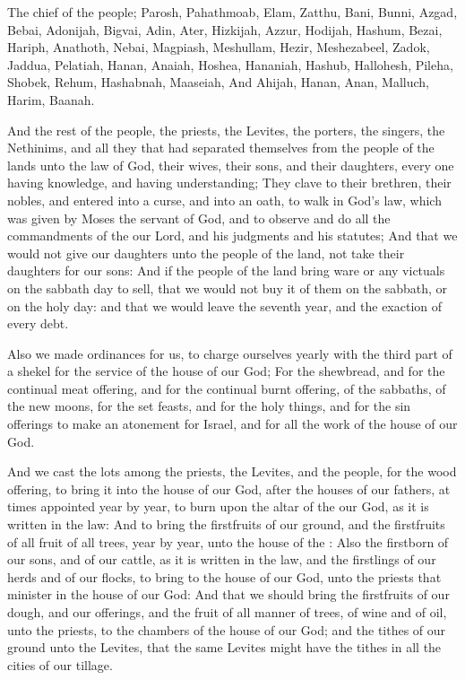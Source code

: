 \Verse The chief of the people; Parosh, Pahathmoab, Elam, Zatthu, Bani, \Verse Bunni, Azgad, Bebai, \Verse Adonijah, Bigvai, Adin, \Verse Ater, Hizkijah, Azzur, \Verse Hodijah, Hashum, Bezai, \Verse Hariph, Anathoth, Nebai, \Verse Magpiash, Meshullam, Hezir, \Verse Meshezabeel, Zadok, Jaddua, \Verse Pelatiah, Hanan, Anaiah, \Verse Hoshea, Hananiah, Hashub, \Verse Hallohesh, Pileha, Shobek, \Verse Rehum, Hashabnah, Maaseiah, \Verse And Ahijah, Hanan, Anan, \Verse Malluch, Harim, Baanah.

\Verse And the rest of the people, the priests, the Levites, the porters, the singers, the Nethinims, and all they that had separated themselves from the people of the lands unto the law of God, their wives, their sons, and their daughters, every one having knowledge, and having understanding; \Verse They clave to their brethren, their nobles, and entered into a curse, and into an oath, to walk in God's law, which was given by Moses the servant of God, and to observe and do all the commandments of the \LORD our Lord, and his judgments and his statutes; \Verse And that we would not give our daughters unto the people of the land, not take their daughters for our sons: \Verse And if the people of the land bring ware or any victuals on the sabbath day to sell, that we would not buy it of them on the sabbath, or on the holy day: and that we would leave the seventh year, and the exaction of every debt.

\Verse Also we made ordinances for us, to charge ourselves yearly with the third part of a shekel for the service of the house of our God; \Verse For the shewbread, and for the continual meat offering, and for the continual burnt offering, of the sabbaths, of the new moons, for the set feasts, and for the holy things, and for the sin offerings to make an atonement for Israel, and for all the work of the house of our God.

\Verse And we cast the lots among the priests, the Levites, and the people, for the wood offering, to bring it into the house of our God, after the houses of our fathers, at times appointed year by year, to burn upon the altar of the \LORD our God, as it is written in the law: \Verse And to bring the firstfruits of our ground, and the firstfruits of all fruit of all trees, year by year, unto the house of the \LORD: \Verse Also the firstborn of our sons, and of our cattle, as it is written in the law, and the firstlings of our herds and of our flocks, to bring to the house of our God, unto the priests that minister in the house of our God: \Verse And that we should bring the firstfruits of our dough, and our offerings, and the fruit of all manner of trees, of wine and of oil, unto the priests, to the chambers of the house of our God; and the tithes of our ground unto the Levites, that the same Levites might have the tithes in all the cities of our tillage.

